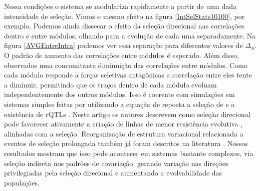 Nessa condições o sistema se modulariza rapidamente a partir de uma dada
intensidade de seleção. 
Vimos o mesmo efeito na figura \ref{IntSelStats10100}, por exemplo.
Podemos ainda dissecar o efeito da seleção direcional nas correlações
dentro e entre módulos, olhando para a evolução de cada uma
separadamente. 
Na figura \ref{AVGEntreIntra} podemos ver essa separação para diferentes
valores de $\Delta_S$. 
O padrão de aumento das correlações entre módulos é esperado. 
Além disso, observados uma concomitante diminuição das correlações entre
módulos. 
Como cada módulo responde a forças seletivas antagônicas a correlação
entre eles tente a diminuir, permitindo que os traços dentro de cada
módulo evoluam independentemente dos outros módulos. 
Isso é coerente com simulações em sistemas simples feitas por
\cite{Pavlicev2010} utilizando a equação
de reposta a seleção de \cite{Lande1979} e a existência de rQTLs
\citep{Pavlicev2008a}. 
Neste artigo os autores descrevem como seleção direcional pode favorecer
ativamente a criação de linhas de menor resistência evolutiva
\citep[direções do espaço morfológico ricas em
variação, veja][]{Schluter1996},  alinhadas com a seleção. 
Reorganização de estrutura variacional relacionada a eventos de seleção
prolongada também já foram descritos na literatura \citep{Young2010}. 
Nossos resultados mostram que isso pode acontecer em sistemas
bastante complexos, via seleção indireta nos padrões de
covariação, gerando variação nas direções privilegiadas pela seleção
direcional e aumentando a evolvabilidade das populações. 

